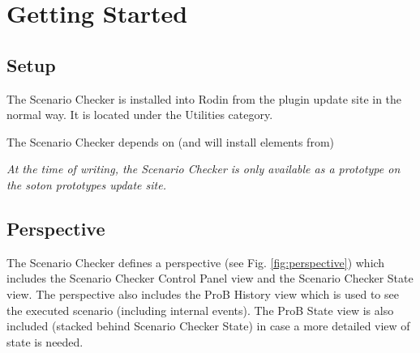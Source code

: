 \section{Getting Started}
\label{sec:getting-started}

\subsection{Setup}
\label{sec:setup}

The Scenario Checker is installed into Rodin from the plugin update site in the normal way.
It is located under the Utilities category.

The Scenario Checker depends on (and will install elements from)

\emph{At the time of writing, the Scenario Checker is only available as a prototype on the soton prototypes update site.}

\subsection{Perspective}
\label{sec:perspective}

The Scenario Checker defines a perspective (see Fig. \ref{fig:perspective}) which includes the Scenario Checker Control Panel view and the Scenario Checker State view.
The perspective also includes the ProB History view which is used to see the executed scenario (including internal events). 
The ProB State view is also included (stacked behind Scenario Checker State) in case a more detailed view of state is needed.

